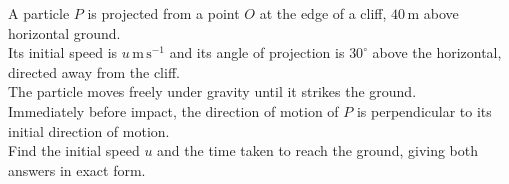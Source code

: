 \documentclass[leqno]{article}
\begin{document}
\djsFrontMatter
\begin{enumerate}[
  label=\textbf{\arabic*.},
  leftmargin=*,
  topsep=0pt,
  partopsep=0pt,
  parsep=0pt
]

\questionitem

A particle $P$ is projected from a point $O$ at the edge of a cliff, $40\,\mathrm{m}$ above horizontal ground. \\
Its initial speed is $u\,\mathrm{m\,s^{-1}}$ and its angle of projection is $30^\circ$ above the horizontal, directed away from the cliff. \\
The particle moves freely under gravity until it strikes the ground. \\

Immediately before impact, the direction of motion of $P$ is perpendicular to its initial direction of motion. \\

Find the initial speed $u$ and the time taken to reach the ground, giving both answers in exact form.  \\

\vspace*{10pt}

\begin{djsSolution}
\begin{djsSolutionFigure}
\end{djsSolutionFigure}
\end{djsSolution}
\end{enumerate}
\end{document}
